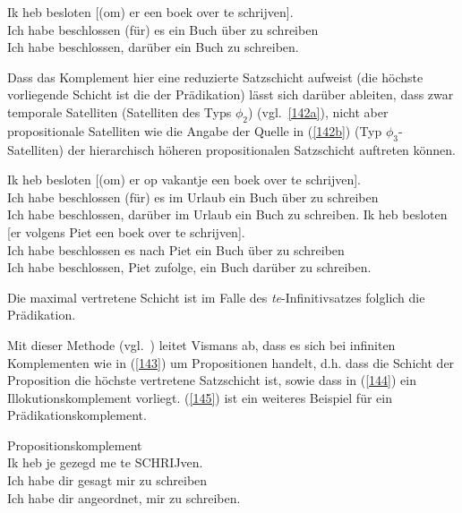 \begin{exe}
	\ex\label{141}
	\gll Ik heb besloten [(om) er een boek over te schrijven].\\
	Ich habe beschlossen (für) es ein Buch über zu schreiben\\
	\glt Ich habe beschlossen, darüber ein Buch zu schreiben.
	\newline
	\hbox{}\hfill\hbox{\citet[152]{Vismans1994}}	
\end{exe}
Dass das Komplement hier eine reduzierte Satzschicht aufweist (die höchste vorliegende Schicht ist die der Prädikation) lässt sich darüber ableiten, dass zwar temporale Satelliten (Satelliten des Typs $\phi_{\textrm{2}}$) (vgl.\ \ref{142a}), nicht aber propositionale Satelliten wie die Angabe der Quelle in (\ref{142b}) (Typ $\phi_{\textrm{3}}$-Satelliten) der hierarchisch höheren propositionalen Satzschicht auftreten können.\largerpage[2]

\begin{exe}
	\ex\label{142} 
	\begin{xlist}	
			\ex\label{142a} 
			\gll Ik heb besloten [(om) er op vakantje een boek over te schrijven].\\
			 Ich habe beschlossen (für) es im Urlaub ein Buch über zu schreiben\\
			\glt Ich habe beschlossen, darüber im Urlaub ein Buch zu schreiben.
			\ex\label{142b}
			\gll *Ik heb besloten [er volgens Piet een boek over te schrijven].\\
			 Ich habe beschlossen es nach Piet ein Buch über zu schreiben\\
			\glt Ich habe beschlossen, Piet zufolge, ein Buch darüber zu schreiben.		
	\end{xlist}
	\hfill\hbox{\citet[152]{Vismans1994}}
\end{exe}
Die maximal vertretene Schicht ist im Falle des \textit{te}-Infinitivsatzes folglich  die Prädikation. 

Mit dieser Methode (vgl.\ \citealt[148--155]{Vismans1994}) leitet Vismans ab, dass es sich bei infiniten Komplementen wie in (\ref{143}) um Propositionen handelt, d.h. dass die Schicht der Proposition die höchste vertretene Satzschicht ist, sowie dass in (\ref{144}) ein Illokutionskomplement vorliegt. (\ref{145}) ist ein weiteres Beispiel für ein Prädikationskomplement.

\begin{exe}
	\ex\label{143}
	Propositionskomplement\\
	\gll Ik heb je gezegd me te SCHRIJven.\\
	Ich habe dir gesagt  mir zu schreiben\\
	\glt Ich habe dir angeordnet, mir zu schreiben.	
\end{exe}

